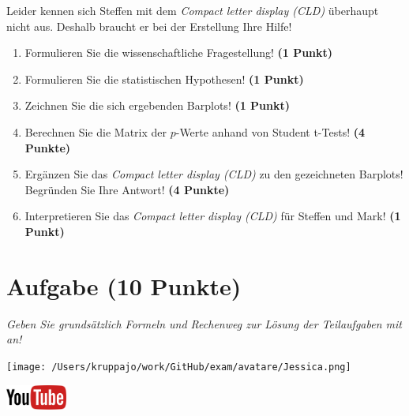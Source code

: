 \documentclass[a4paper, 9pt]{scrartcl}\usepackage[]{graphicx}\usepackage[]{xcolor}
\begin{document}
Leider kennen sich Steffen mit dem \textit{Compact letter display (CLD)} überhaupt nicht aus. Deshalb braucht er bei der Erstellung Ihre Hilfe!

\begin{enumerate}
  \item Formulieren Sie die wissenschaftliche Fragestellung! \textbf{(1 Punkt)}
  \item Formulieren Sie die statistischen Hypothesen! \textbf{(1 Punkt)}
\item Zeichnen Sie die sich ergebenden Barplots! \textbf{(1 Punkt)}
\item Berechnen Sie die Matrix der $p$-Werte anhand von Student t-Tests! \textbf{(4 Punkte)}
\item Ergänzen Sie das \textit{Compact letter display (CLD)} zu den gezeichneten Barplots! Begründen Sie Ihre Antwort! \textbf{(4 Punkte)}
\item Interpretieren Sie das \textit{Compact letter display (CLD)} für Steffen und Mark! \textbf{(1 Punkt)} 
\end{enumerate}

 
\clearpage

\section{Aufgabe \hfill (10 Punkte)}

\textit{Geben Sie grundsätzlich Formeln und Rechenweg zur Lösung der Teilaufgaben mit an!} \\[1Ex]
 

 
\begin{minipage}[t]{0.5\textwidth}
\texttt{[image: /Users/kruppajo/work/GitHub/exam/avatare/Jessica.png]}
\end{minipage}
\begin{minipage}[t]{0.5\textwidth}
\hfill
\href{https://youtu.be/RagTFFKFbFg}{\includegraphics[width = 2cm]{img/youtube}}
\end{minipage}
\vspace{1ex}
\end{document}
